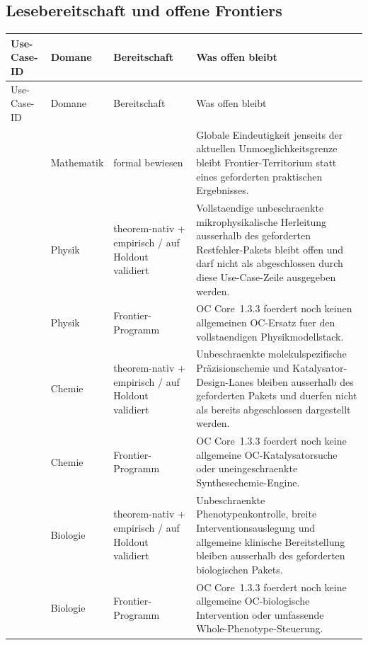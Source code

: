 \subsection{Lesebereitschaft und offene Frontiers}
\begin{longtable}{@{}L{0.15\textwidth}L{0.12\textwidth}L{0.13\textwidth}L{0.50\textwidth}@{}}
\toprule
Use-Case-ID & Domane & Bereitschaft & Was offen bleibt \\
\midrule
\endfirsthead
\toprule
Use-Case-ID & Domane & Bereitschaft & Was offen bleibt \\
\midrule
\endhead
{} & Mathematik & formal bewiesen & Globale Eindeutigkeit jenseits der aktuellen Unmoeglichkeitsgrenze bleibt Frontier-Territorium statt eines geforderten praktischen Ergebnisses. \\
 & Physik & theorem-nativ + empirisch / auf Holdout validiert & Vollstaendige unbeschraenkte mikrophysikalische Herleitung ausserhalb des geforderten Restfehler-Pakets bleibt offen und darf nicht als abgeschlossen durch diese Use-Case-Zeile ausgegeben werden. \\
 & Physik & Frontier-Programm & OC Core~1.3.3 foerdert noch keinen allgemeinen OC-Ersatz fuer den vollstaendigen Physikmodellstack. \\
 & Chemie & theorem-nativ + empirisch / auf Holdout validiert & Unbeschraenkte molekulspezifische Präzisionschemie und Katalysator-Design-Lanes bleiben ausserhalb des geforderten Pakets und duerfen nicht als bereits abgeschlossen dargestellt werden. \\
 & Chemie & Frontier-Programm & OC Core~1.3.3 foerdert noch keine allgemeine OC-Katalysatorsuche oder uneingeschraenkte Synthesechemie-Engine. \\
 & Biologie & theorem-nativ + empirisch / auf Holdout validiert & Unbeschraenkte Phenotypenkontrolle, breite Interventionsauslegung und allgemeine klinische Bereitstellung bleiben ausserhalb des geforderten biologischen Pakets. \\
 & Biologie & Frontier-Programm & OC Core~1.3.3 foerdert noch keine allgemeine OC-biologische Intervention oder umfassende Whole-Phenotype-Steuerung. \\

\end{longtable}
